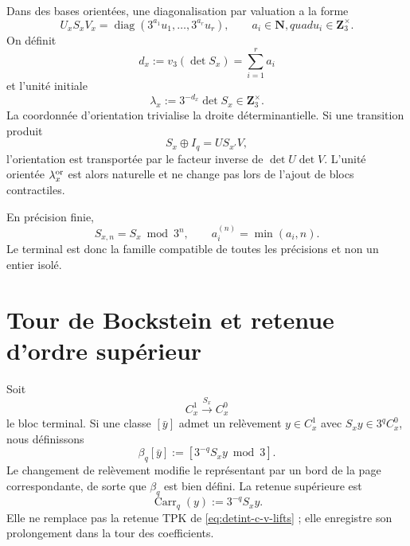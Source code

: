 Dans des bases orientées, une diagonalisation par valuation a la forme
\begin{equation}\label{eq:detint-smith}
 U_xS_xV_x
 =\operatorname{diag}(3^{a_1}u_1,\ldots,3^{a_r}u_r),
 \qquad
 a_i\in\mathbf N,quad u_i\in\mathbf Z_3^\times.
\end{equation}
On définit
\begin{equation}\label{eq:detint-orden-d}
 d_x:=v_3(\det S_x)=\sum_{i=1}^r a_i
\end{equation}
et l'unité initiale
\begin{equation}\label{eq:detint-leading-unit}
 \lambda_x:=3^{-d_x}\det S_x\in\mathbf Z_3^\times.
\end{equation}
La coordonnée d'orientation trivialise la droite déterminantielle. Si une
transition produit
\begin{equation}\label{eq:detint-estabilidad-bloques}
 S_x\oplus I_q=U S_{x'}V,
\end{equation}
l'orientation est transportée par le facteur inverse de \(\det U\det V\).
L'unité orientée \(\lambda_x^{\rm or}\) est alors naturelle et ne change pas
lors de l'ajout de blocs contractiles.

En précision finie,
\begin{equation}\label{eq:detint-smith-finito}
 S_{x,n}=S_x\bmod3^n,
 \qquad
 a_i^{(n)}=\min(a_i,n).
\end{equation}
Le terminal est donc la famille compatible de toutes les précisions et
non un entier isolé.

\section{Tour de Bockstein et retenue d'ordre supérieur}

Soit
\[
 C_x^1\xrightarrow{S_x}C_x^0
\]
le bloc terminal. Si une classe \([\bar y]\) admet un relèvement
\(y\in C_x^1\) avec \(S_xy\in3^qC_x^0\), nous définissons
\begin{equation}\label{eq:detint-beta-q}
 \beta_q[\bar y]
 :=\left[3^{-q}S_xy\bmod3\right].
\end{equation}
Le changement de relèvement modifie le représentant par un bord de la page
correspondante, de sorte que \(\beta_q\) est bien défini. La retenue
supérieure est
\begin{equation}\label{eq:detint-carry-superior}
 \operatorname{Carr}_q(y):=3^{-q}S_xy.
\end{equation}
Elle ne remplace pas la retenue TPK de \eqref{eq:detint-c-v-lifts} ; elle enregistre son
prolongement dans la tour des coefficients.

